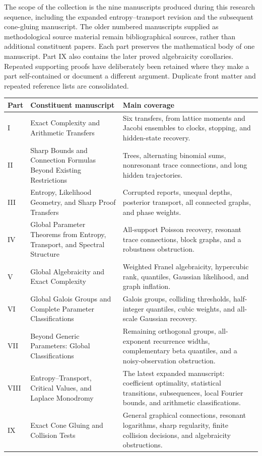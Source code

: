 \documentclass[11pt,a4paper]{article}
\theoremstyle{definition}
\theoremstyle{remark}
\numberwithin{equation}{section}
\begin{document}
The scope of the collection is the nine manuscripts produced during this
research sequence, including the expanded entropy--transport revision and the subsequent cone-gluing manuscript. The older
numbered manuscripts supplied as methodological source material remain
bibliographical sources, rather than additional constituent papers.
Each part preserves the mathematical body of one manuscript. Part IX also contains the later proved algebraicity
corollaries. Repeated
supporting proofs have deliberately been retained where they make a part
self-contained or document a different argument. Duplicate front matter
and repeated reference lists are consolidated.

\begin{center}\small
\begin{tabular}{@{}>{\raggedright\arraybackslash}p{}>{\raggedright\arraybackslash}p{}>{\raggedright\arraybackslash}p{}@{}}
\toprule
Part & Constituent manuscript & Main coverage\\
\midrule
I & Exact Complexity and Arithmetic Transfers & Six transfers, from lattice moments and Jacobi ensembles to clocks, stopping, and hidden-state recovery.\\[5pt]
II & Sharp Bounds and Connection Formulas Beyond Existing Restrictions & Trees, alternating binomial sums, nonresonant trace connections, and long hidden trajectories.\\[5pt]
III & Entropy, Likelihood Geometry, and Sharp Proof Transfers & Corrupted reports, unequal depths, posterior transport, all connected graphs, and phase weights.\\[5pt]
IV & Global Parameter Theorems from Entropy, Transport, and Spectral Structure & All-support Poisson recovery, resonant trace connections, block graphs, and a robustness obstruction.\\[5pt]
V & Global Algebraicity and Exact Complexity & Weighted Franel algebraicity, hypercubic rank, quantiles, Gaussian likelihood, and graph inflation.\\[5pt]
VI & Global Galois Groups and Complete Parameter Classifications & Galois groups, colliding thresholds, half-integer quantiles, cubic weights, and all-scale Gaussian recovery.\\[5pt]
VII & Beyond Generic Parameters: Global Classifications & Remaining orthogonal groups, all-exponent recurrence widths, complementary beta quantiles, and a noisy-observation obstruction.\\[5pt]
VIII & Entropy--Transport, Critical Values, and Laplace Monodromy & The latest expanded manuscript: coefficient optimality, statistical transitions, subsequences, local Fourier bounds, and arithmetic classifications.\\
IX & Exact Cone Gluing and Collision Tests & General graphical connections, resonant logarithms, sharp regularity, finite collision decisions, and algebraicity obstructions.\\
\bottomrule
\end{tabular}
\end{center}
\end{document}
